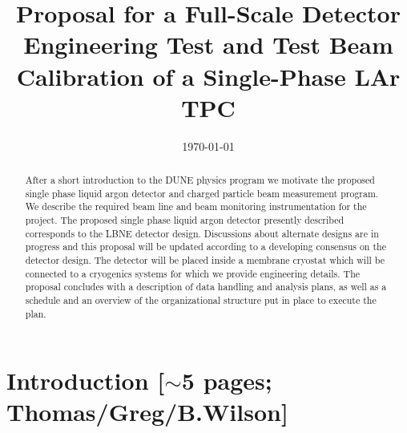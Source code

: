 \documentclass[12pt]{article}
\begin{document}
\linenumbers

\title{  Proposal for a Full-Scale Detector Engineering Test and Test Beam Calibration of a Single-Phase LAr TPC}

\date{\today}
%	
	

\maketitle




\begin{abstract}

After a short introduction to the DUNE physics program we motivate the proposed single phase liquid argon detector and charged particle beam measurement program. 
We describe the required beam line and beam monitoring instrumentation for the project.
The proposed single phase liquid argon detector presently described corresponds to the LBNE detector design. Discussions about alternate designs are in progress and this proposal will be updated according to a developing consensus on the detector design. The detector will be placed inside a membrane cryostat which will be connected to a cryogenics systems for which we provide engineering details. The proposal concludes with a description of data handling and analysis plans, as well as a schedule and an overview of the organizational structure put in place to execute the plan.

\end{abstract}

\newpage
\tableofcontents

\newpage

\section{Introduction [$\sim$5 pages; {\color{red} Thomas/Greg/B.Wilson}]}
	
%	

\end{document}
